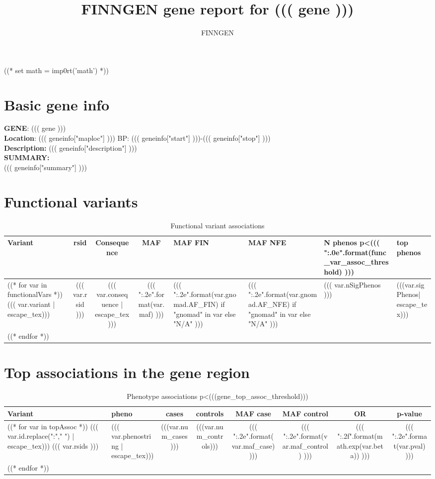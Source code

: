 \documentclass{article}
\begin{document}
\title {FINNGEN gene report for ((( gene ))) }
\author{FINNGEN}
\maketitle
\newpage
\newpage
((* set math = imp0rt('math') *))
\section{ Basic gene info }
\textbf{GENE}: ((( gene ))) \\
\medskip
\textbf{Location}: ((( geneinfo["maploc"] ))) BP: ((( geneinfo["start"] )))-((( geneinfo["stop"] ))) \\
\medskip
\textbf{Description:} ((( geneinfo["description"] ))) \\
\medskip
\textbf{SUMMARY:} \\
((( geneinfo["summary"] )))
\newpage



\begingroup
\renewcommand{\arraystretch}{1.5}
\section{ Functional variants }
\begin{longtable}{p{1.5cm}|c|c|c|C{1.3cm}|C{1.3cm}|C{1.2cm}|L{4.8cm} }
\caption{ Functional variant associations }\\
Variant & rsid & Consequence & MAF & MAF FIN & MAF NFE & N phenos p\textless((( "{:.0e}".format(func_var_assoc_threshold) ))) & top phenos \\
\hline
((* for var in functionalVars *))
    ((( var.variant | escape_tex))) & ((( var.rsid ))) & (((  var.consequence | escape_tex))) & ((( "{:.2e}".format(var.maf) ))) & ((( "{:.2e}".format(var.gnomad.AF_FIN) if "gnomad" in var else "N/A" ))) & ((( "{:.2e}".format(var.gnomad.AF_NFE) if "gnomad" in var else "N/A" ))) & ((( var.nSigPhenos ))) & (((var.sigPhenos| escape_tex)))  \\
((* endfor *))

\end{longtable}
\newpage

\section{ Top associations in the gene region }
\begin{longtable}{ >{\RaggedRight}p{3cm}|>{\RaggedRight}p{3cm}|c|c|c|c|c|c }
\caption{ Phenotype associations p\textless (((gene_top_assoc_threshold))) }\\
Variant & pheno & cases & controls & MAF case & MAF control & OR & p-value  \\
\hline
((* for var in topAssoc *))
((( var.id.replace(":"," ") | escape_tex))) \newline ((( var.rsids ))) & ((( var.phenostring | escape_tex))) & (((var.num_cases ))) & (((var.num_controls))) & ((( "{:.2e}".format(var.maf_case) ))) & ((( "{:.2e}".format(var.maf_control) ))) & ((( "{:.2f}".format(math.exp(var.beta)) ))) & ((( "{:.2e}".format(var.pval) ))) \\
((* endfor *))
\end{longtable}
\end{document}
